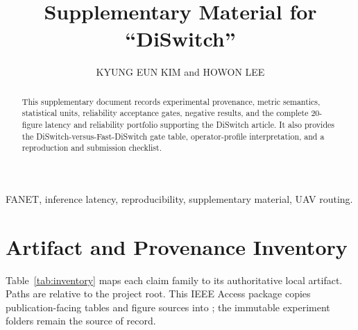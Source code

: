 \documentclass{ieeeaccess}
\begin{document}
\title{Supplementary Material for ``DiSwitch''}
\author{\uppercase{Kyung Eun Kim} and \uppercase{Howon Lee}}
\address[1]{Department of Military Digital Convergence, Ajou University, Suwon 16499, Republic of Korea}
\begin{abstract}
This supplementary document records experimental provenance, metric semantics, statistical units, reliability acceptance gates, negative results, and the complete 20-figure latency and reliability portfolio supporting the DiSwitch article. It also provides the DiSwitch-versus-Fast-DiSwitch gate table, operator-profile interpretation, and a reproduction and submission checklist.
\end{abstract}
\begin{keywords}
FANET, inference latency, reproducibility, supplementary material, UAV routing.
\end{keywords}
\titlepgskip=-21pt
\maketitle

\section{Artifact and Provenance Inventory}

Table~\ref{tab:inventory} maps each claim family to its authoritative local artifact. Paths are relative to the project root. This IEEE Access package copies publication-facing tables and figure sources into \texttt{}; the immutable experiment folders remain the source of record.
\end{document}
